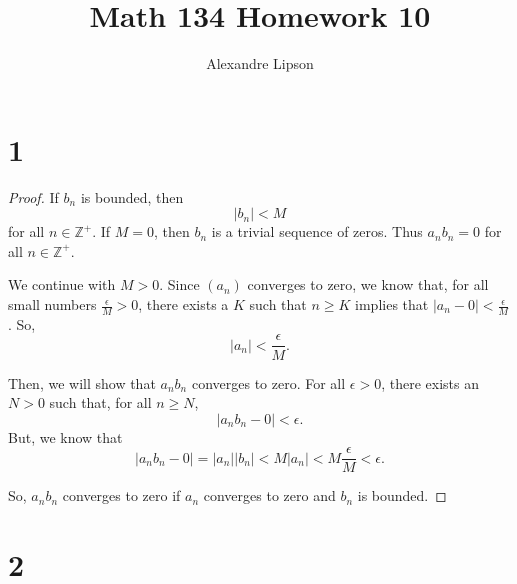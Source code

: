 \documentclass{article}
\title{Math 134 Homework 10}
\author{Alexandre Lipson}
\begin{document}
\maketitle

\section*{1}

\begin{proof}
If $b_n$ is bounded, then \[|b_n|<M\] for all $n\in\mathbb{Z}^+$.
If $M=0$, then $b_n$ is a trivial sequence of zeros.
Thus $a_n b_n=0$ for all $n\in\mathbb{Z}^+$.

We continue with $M>0$. Since $(a_n)$ converges to zero, we know that, for all small numbers $\frac{\epsilon}{M}>0$, there exists a $K$ such that $n\geq K$ implies that $|a_n-0|<\frac{\epsilon}{M}$.
So, \[|a_n|<\frac{\epsilon}{M}.\]

Then, we will show that $a_n b_n$ converges to zero.
For all $\epsilon>0$, there exists an $N>0$ such that, for all $n\geq N$, \[|a_n b_n - 0|<\epsilon.\]
But, we know that \[|a_n b_n - 0|=|a_n||b_n|<M|a_n|<M\frac{\epsilon}{M}<\epsilon.\]

So, $a_n b_n$ converges to zero if $a_n$ converges to zero and $b_n$ is bounded.
\end{proof}

\section*{2}
\end{document}
